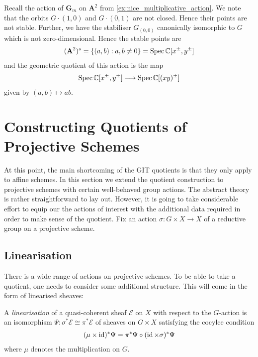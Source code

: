 \documentclass[12pt]{ociamthesis}  %
\begin{document}
\begin{example}
  Recall the action of $\mathbf G_m$ on $\mathbf A^2$ from
  \ref{ex:nice_multiplicative_action}. We note that the orbits
  $G\cdot(1,0)$ and $G\cdot(0,1)$ are not closed. Hence their points
  are not stable. Further, we have the stabiliser $G_{(0,0)}$
  canonically isomorphic to $G$ which is not zero-dimensional.
  Hence the stable points are
  \begin{align*}
    (\mathbf A^2)^s = \{(a,b):a,b\neq 0\} = \operatorname{Spec} \mathbb C[x^\pm,y^\pm]
  \end{align*}
  and the geometric quotient of this action is the map
  \begin{align*}
    \operatorname{Spec}\mathbb C[x^\pm,y^\pm]\longrightarrow\operatorname{Spec}\mathbb C[(xy)^\pm]
  \end{align*}
  given by $(a,b)\mapsto ab$.
\end{example}

\section{Constructing Quotients of Projective Schemes}

At this point, the main shortcoming of the GIT quotients is that they
only apply to affine schemes. In this section we extend the quotient construction
to projective schemes with certain well-behaved group actions.
The abstract theory is rather straightforward to lay out. However,
it is going to take considerable effort to equip our the actions of interest
with the additional data required in order to make sense of the quotient.
Fix an action $\sigma : G\times X\to X$ of a reductive
group on a projective scheme.

\subsection{Linearisation}

There is a wide range of actions on projective schemes. To be able to
take a quotient, one needs to consider some additional structure. This
will come in the form of linearised sheaves:

\begin{definition}
  A \emph{linearisation} of a quasi-coherent sheaf
  $\mathscr E$ on $X$ with respect to the $G$-action
  is an isomorphism $\Psi : \sigma^*\mathscr E \cong\pi^*\mathscr E$
  of sheaves on $G\times X$ satisfying the cocylce condition
  \begin{align}\label{eq:cocyle_condition}
    (\mu \times \operatorname{id})^*\Psi = \pi^*\Psi \circ (\operatorname{id}\times\sigma)^*\Psi
  \end{align}
  where $\mu$ denotes the multiplication on $G$.
\end{definition}
\end{document}
